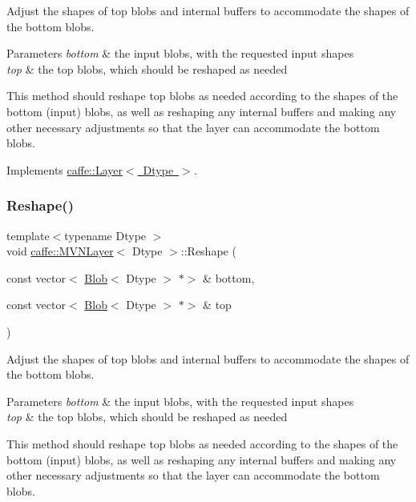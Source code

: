 Adjust the shapes of top blobs and internal buffers to accommodate the shapes of the bottom blobs. 


\begin{DoxyParams}{Parameters}
{\em bottom} & the input blobs, with the requested input shapes \\
\hline
{\em top} & the top blobs, which should be reshaped as needed\\
\hline
\end{DoxyParams}
This method should reshape top blobs as needed according to the shapes of the bottom (input) blobs, as well as reshaping any internal buffers and making any other necessary adjustments so that the layer can accommodate the bottom blobs. 

Implements \mbox{\hyperlink{classcaffe_1_1_layer_a7fe981e8af8d93d587acf2a952be563d}{caffe\+::\+Layer$<$ Dtype $>$}}.

\mbox{\label{classcaffe_1_1_m_v_n_layer_a48aafabe729bb3b22171cfdbda6e6073}} 
\subsubsection{\texorpdfstring{Reshape()}{Reshape()}\hspace{0.1cm}{\footnotesize\ttfamily [2/2]}}
{\footnotesize\ttfamily template$<$typename Dtype $>$ \\
void \mbox{\hyperlink{classcaffe_1_1_m_v_n_layer}{caffe\+::\+M\+V\+N\+Layer}}$<$ Dtype $>$\+::Reshape (\begin{DoxyParamCaption}\item[{const vector$<$ \mbox{\hyperlink{classcaffe_1_1_blob}{Blob}}$<$ Dtype $>$ $\ast$$>$ \&}]{bottom,  }\item[{const vector$<$ \mbox{\hyperlink{classcaffe_1_1_blob}{Blob}}$<$ Dtype $>$ $\ast$$>$ \&}]{top }\end{DoxyParamCaption})\hspace{0.3cm}{\ttfamily [virtual]}}



Adjust the shapes of top blobs and internal buffers to accommodate the shapes of the bottom blobs. 


\begin{DoxyParams}{Parameters}
{\em bottom} & the input blobs, with the requested input shapes \\
\hline
{\em top} & the top blobs, which should be reshaped as needed\\
\hline
\end{DoxyParams}
This method should reshape top blobs as needed according to the shapes of the bottom (input) blobs, as well as reshaping any internal buffers and making any other necessary adjustments so that the layer can accommodate the bottom blobs. 

